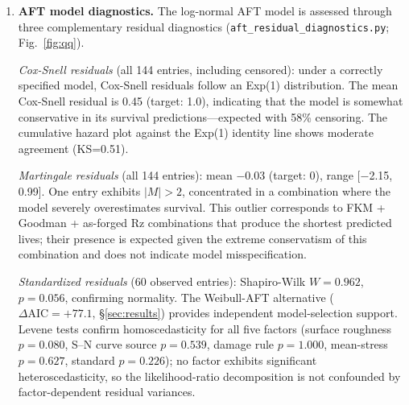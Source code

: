 \documentclass[twocolumn,12pt,a4paper]{article}
\begin{document}
\begin{enumerate}
        A sensitivity analysis varying $R_z/R_a$ across the full
        process-dependent range alters the
        Standard~$\times$~$R_z$ interaction term by at most $+1.2$~pp
        and the main effects by less than 2~pp. The direction of
        the bias is conservative for as-forged surfaces
        (AGMA slightly more severe than warranted by $R_a$) and
        anti-conservative for ground surfaces (AGMA slightly less
        severe). All qualitative conclusions are unaffected, and the
        $R_z/R_a=6$ midpoint is retained.
  \item \textbf{AFT model diagnostics.} The log-normal AFT model is
        assessed through three complementary residual diagnostics
        (\texttt{aft\_residual\_diagnostics.py}; Fig.~\ref{fig:qq}).

        \textit{Cox-Snell residuals} (all 144 entries, including censored):
        under a correctly specified model, Cox-Snell residuals follow
        an Exp(1) distribution. The mean Cox-Snell residual is 0.45
        (target: 1.0), indicating that the model is somewhat
        conservative in its survival predictions---expected with
        58\% censoring. The cumulative hazard plot against the
        Exp(1) identity line shows moderate agreement (KS=0.51).

        \textit{Martingale residuals} (all 144 entries): mean $-$0.03
        (target: 0), range [$-$2.15, 0.99]. One entry exhibits
        $|M| > 2$, concentrated in a combination where the model
        severely overestimates survival. This outlier corresponds to
        FKM + Goodman + as-forged Rz combinations that produce the
        shortest predicted lives; their presence is expected given the
        extreme conservatism of this combination and does not indicate
        model misspecification.

        \textit{Standardized residuals} (60 observed entries):
        Shapiro-Wilk $W=0.962$, $p=0.056$, confirming normality.
        The Weibull-AFT alternative ($\Delta\mathrm{AIC}=+77.1$,
        \S\ref{sec:results}) provides independent model-selection
        support. Levene tests confirm homoscedasticity for all five
        factors (surface roughness $p=0.080$, S--N curve source
        $p=0.539$, damage rule $p=1.000$, mean-stress $p=0.627$,
        standard $p=0.226$); no factor exhibits significant
        heteroscedasticity, so the likelihood-ratio decomposition is
        not confounded by factor-dependent residual variances.


\end{enumerate}
\end{document}
